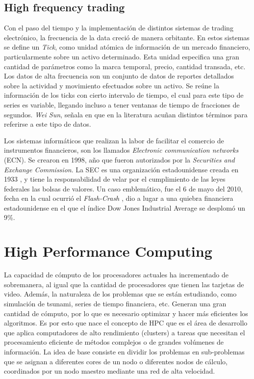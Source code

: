 \subsection{High frequency trading}

Con el paso del tiempo y la implementación de distintos sistemas de trading electrónico, la frecuencia de la data creció de manera
orbitante. En estos sistemas se define un \emph{Tick}, como unidad atómica de información de un mercado financiero, particularmente sobre un activo determinado.
Esta unidad especifica una gran cantidad de parámetros como la marca temporal, precio, cantidad transada, etc. Los datos de alta frecuencia son un conjunto de datos 
de reportes detallados sobre la actividad y movimiento efectuados sobre un activo. Se reúne la información de los ticks con cierto intervalo de tiempo, 
el cual para este tipo de series es variable, llegando incluso a tener ventanas de tiempo de fracciones de segundos. \emph{Wei Sun}, señala en \cite{ei2007quantitative}
que en la literatura acuñan distintos términos para referirse a este tipo de datos.

Los sistemas informáticos que realizan la labor de facilitar el comercio de instrumentos financieros, son los llamados \emph{Electronic communication networks} (ECN).
Se crearon en 1998, año que fueron autorizados por la \emph{Securities and Exchange Commission}. La SEC es una organización estadounidense creada en 1933 \cite{hasbrouck2004economic}, 
y tiene la responsabilidad de velar por el cumplimiento de las leyes federales las bolsas de valores. Un caso emblemático, fue el 6 de mayo del 2010, fecha en la cual ocurrió el 
\emph{Flash-Crash} \cite{arndt2011high}, dio a lugar a una quiebra financiera estadounidense en el que el índice Dow Jones Industrial Average se desplomó un 9\%.

\section{High Performance Computing}

La capacidad de cómputo de los procesadores actuales ha incrementado de sobremanera, al igual que la cantidad de procesadores que tienen las tarjetas de video. Además, la
naturaleza de los problemas que se están estudiando, como simulación de tsunami, series de tiempo financiera, etc. Generan una gran cantidad de cómputo, por lo que es
necesario optimizar y hacer más eficientes los algoritmos. Es por esto que nace el concepto de HPC que es el área de desarrollo que aplica computadores de alto rendimiento 
(clusters) a tareas que necesitan el procesamiento eficiente de métodos complejos o de grandes volúmenes de información. La idea de base consiste en dividir los problemas 
en sub-problemas que se asignan a diferentes cores de un nodo o diferentes nodos de cálculo, coordinados por un nodo maestro mediante una red de alta velocidad. 

